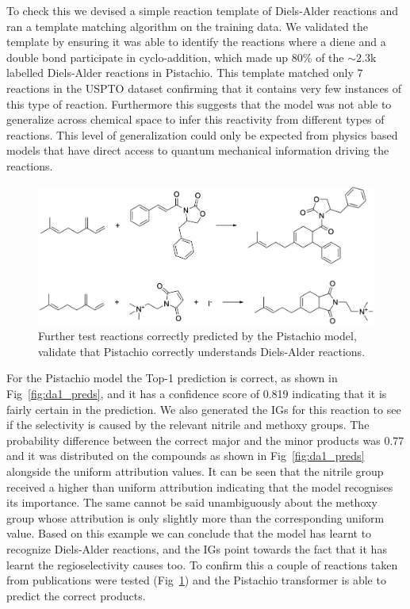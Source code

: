 To check this we devised a simple reaction template of Diels-Alder reactions and ran a template matching algorithm on the training data. We validated the template by ensuring it was able to identify the reactions where a diene and a double bond participate in cyclo-addition, which made up 80\% of the $\sim$2.3k labelled Diels-Alder reactions in Pistachio. This template matched only 7 reactions in the USPTO dataset confirming that it contains very few instances of this type of reaction. Furthermore this suggests that the model was not able to generalize across chemical space to infer this reactivity from different types of reactions. This level of generalization could only be expected from physics based models that have direct access to quantum mechanical information driving the reactions.

\begin{figure}[htbp!] 
\centering    
\includegraphics[width=1.0\textwidth]{Chapters/Ch4/Figs/da1_adv.png}
\caption[Diels-Alder]{Further test reactions correctly predicted by the Pistachio model, validate that Pistachio correctly understands Diels-Alder reactions. \cite{Husinec2011AnnulationsDerivatives, Tiamas2018AsymmetricChalcones}}
\label{fig:da1_adv}
\end{figure}

For the Pistachio model the Top-1 prediction is correct, as shown in Fig~\ref{fig:da1_preds}, and it has a confidence score of 0.819 indicating that it is fairly certain in the prediction. We also generated the IGs for this reaction to see if the selectivity is caused by the relevant nitrile and methoxy groups. The probability difference between the correct major and the minor products was 0.77 and it was distributed on the compounds as shown in Fig~\ref{fig:da1_preds} alongside the uniform attribution values. It can be seen that the nitrile group received a higher than uniform attribution indicating that the model recognises its importance. The same cannot be said unambiguously about the methoxy group whose attribution is only slightly more than the corresponding uniform value. Based on this example we can conclude that the model has learnt to recognize Diels-Alder reactions, and the IGs point towards the fact that it has learnt the regioselectivity causes too. To confirm this a couple of reactions taken from publications were tested (Fig~\ref{fig:da1_adv}) and the Pistachio transformer is able to predict the correct products. 

